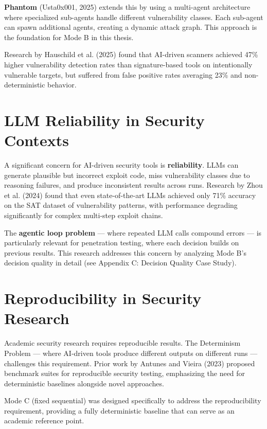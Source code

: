 \documentclass[12pt,a4paper,oneside]{book}
\begin{document}
\textbf{Phantom} (Usta0x001, 2025) extends this by using a multi-agent architecture where specialized sub-agents handle different vulnerability classes. Each sub-agent can spawn additional agents, creating a dynamic attack graph. This approach is the foundation for Mode B in this thesis.

Research by Hauschild et al. (2025) found that AI-driven scanners achieved 47\% higher vulnerability detection rates than signature-based tools on intentionally vulnerable targets, but suffered from false positive rates averaging 23\% and non-deterministic behavior.

\section{LLM Reliability in Security Contexts}

A significant concern for AI-driven security tools is \textbf{reliability}. LLMs can generate plausible but incorrect exploit code, miss vulnerability classes due to reasoning failures, and produce inconsistent results across runs. Research by Zhou et al. (2024) found that even state-of-the-art LLMs achieved only 71\% accuracy on the SAT dataset of vulnerability patterns, with performance degrading significantly for complex multi-step exploit chains.

The \textbf{agentic loop problem} — where repeated LLM calls compound errors — is particularly relevant for penetration testing, where each decision builds on previous results. This research addresses this concern by analyzing Mode B's decision quality in detail (see Appendix C: Decision Quality Case Study).

\section{Reproducibility in Security Research}

Academic security research requires reproducible results. The Determinism Problem — where AI-driven tools produce different outputs on different runs — challenges this requirement. Prior work by Antunes and Vieira (2023) proposed benchmark suites for reproducible security testing, emphasizing the need for deterministic baselines alongside novel approaches.

Mode C (fixed sequential) was designed specifically to address the reproducibility requirement, providing a fully deterministic baseline that can serve as an academic reference point.
\end{document}
